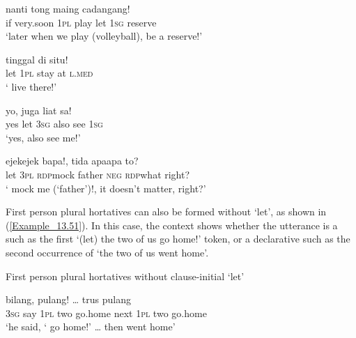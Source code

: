 \ea
\label{Example_13.47}
 {nanti} {tong} {maing} {} {} {cadangang!}\\ %
 if  very.soon  \textsc{1pl}  play  let  \textsc{1sg}  reserve\\
\glt 
‘later when we play (volleyball),  be a reserve!’ \textstyleExampleSource{[081109-001-Cv.0154]}
\z

\ea
\label{Example_13.48}
\gll  {}    tinggal  di  situ!\\
 let  \textsc{1pl}  stay  at  \textsc{l.med}\\
\glt 
‘ live there!’ \textstyleExampleSource{[081110-008-CvNP.0091]}
\z

\ea
\label{Example_13.49}
\gll  yo,      juga  liat  sa!\\
 yes  let  \textsc{3sg}  also  see  \textsc{1sg}\\
\glt 
‘yes,  also see me!’ \textstyleExampleSource{[081015-005-NP.0013]}
\z

\ea
\label{Example_13.50}
 {} {ejek{\Tilde}ejek} {bapa!,} {tida} {apa{\Tilde}apa} {to?}\\ %
 let  \textsc{3pl}  \textsc{rdp}{\Tilde}mock  father  \textsc{neg}  \textsc{rdp}{\Tilde}what  right?\\
\glt 
‘ mock me (‘father’)!, it doesn’t matter, right?’ \textstyleExampleSource{[080922-001a-CvPh.0180]}
\z


First person plural hortatives can also be formed without  ‘let’, as shown in (\ref{Example_13.51}). In this case, the context shows whether the utterance is a  such as the first  ‘(let) the two of us go home!’ token, or a declarative such as the second occurrence of  ‘the two of us went home’.


\begin{styleExampleTitle}
First person plural hortatives without clause-initial  ‘let’
\end{styleExampleTitle}

\ea
\label{Example_13.51}
 {bilang,} {} {} {} {pulang!} {\ldots} {trus} {} {} {pulang}\\ %
 \textsc{3sg}  say  {}  \textsc{1pl}  two  go.home {}   next  \textsc{1pl}  two  go.home\\
\glt 
‘he said, ‘ go home!’ {\ldots} then  went home’ \textstyleExampleSource{[081015-005-NP.0035]}
\z


